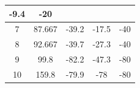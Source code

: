 \documentclass[UTF8,10pt,a4paper,fontset=fandol]{ctexart}
\newcommand{\fieldvalue}[1]{#1}
\begin{document}
\begin{tabularx}{0.55\textwidth}{|c|c|c|c|c|}
\fieldvalue{-9.4} &
\fieldvalue{-20} \\
\hline
\fieldvalue{7} &
\fieldvalue{87.667} &
\fieldvalue{-39.2} &
\fieldvalue{-17.5} &
\fieldvalue{-40} \\
\hline
\fieldvalue{8} &
\fieldvalue{92.667} &
\fieldvalue{-39.7} &
\fieldvalue{-27.3} &
\fieldvalue{-40} \\
\hline
\fieldvalue{9} &
\fieldvalue{99.8} &
\fieldvalue{-82.2} &
\fieldvalue{-47.3} &
\fieldvalue{-80} \\
\hline
\fieldvalue{10} &
\fieldvalue{159.8} &
\fieldvalue{-79.9} &
\fieldvalue{-78} &
\fieldvalue{-80} \\
\hline
\end{tabularx}

\vspace{1em}
\end{document}
